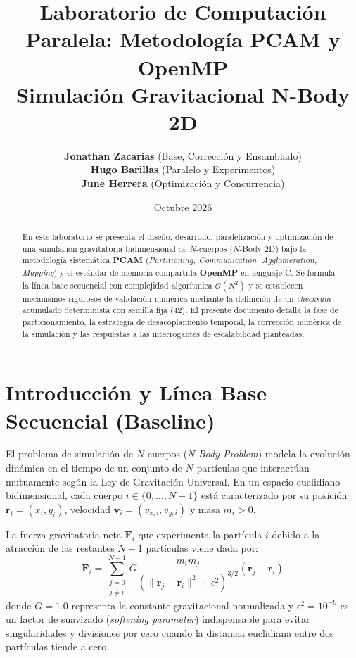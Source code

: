 \documentclass[11pt,a4paper]{article}
\title{
    \vspace{-1.5cm}
    \textbf{\Large Laboratorio de Computación Paralela: Metodología PCAM y OpenMP}\\[0.2cm]
    \textbf{\large Simulación Gravitacional N-Body 2D}
}
\author{
    \textbf{Jonathan Zacarias} (Base, Corrección y Ensamblado) \\
    \textbf{Hugo Barillas} (Paralelo y Experimentos) \\
    \textbf{June Herrera} (Optimización y Concurrencia)
}
\date{Octubre 2026}
\begin{document}
\maketitle

\begin{abstract}
En este laboratorio se presenta el diseño, desarrollo, paralelización y optimización de una simulación gravitatoria bidimensional de $N$-cuerpos ($N$-Body 2D) bajo la metodología sistemática \textbf{PCAM} (\textit{Partitioning, Communication, Agglomeration, Mapping}) y el estándar de memoria compartida \textbf{OpenMP} en lenguaje C. Se formula la línea base secuencial con complejidad algorítmica $\mathcal{O}(N^2)$ y se establecen mecanismos rigurosos de validación numérica mediante la definición de un \textit{checksum} acumulado determinista con semilla fija ($42$). El presente documento detalla la fase de particionamiento, la estrategia de desacoplamiento temporal, la corrección numérica de la simulación y las respuestas a las interrogantes de escalabilidad planteadas.
\end{abstract}

\vspace{0.3cm}

\section{Introducción y Línea Base Secuencial (Baseline)}

El problema de simulación de $N$-cuerpos (\textit{N-Body Problem}) modela la evolución dinámica en el tiempo de un conjunto de $N$ partículas que interactúan mutuamente según la Ley de Gravitación Universal. En un espacio euclidiano bidimensional, cada cuerpo $i \in \{0, \dots, N-1\}$ está caracterizado por su posición $\mathbf{r}_i = (x_i, y_i)$, velocidad $\mathbf{v}_i = (v_{x,i}, v_{y,i})$ y masa $m_i > 0$.

La fuerza gravitatoria neta $\mathbf{F}_i$ que experimenta la partícula $i$ debido a la atracción de las restantes $N-1$ partículas viene dada por:
\begin{equation}
    \mathbf{F}_i = \sum_{\substack{j=0 \\ j \neq i}}^{N-1} G \frac{m_i m_j}{\left( \|\mathbf{r}_j - \mathbf{r}_i\|^2 + \epsilon^2 \right)^{3/2}} (\mathbf{r}_j - \mathbf{r}_i)
    \label{eq:fuerza}
\end{equation}
donde $G = 1.0$ representa la constante gravitacional normalizada y $\epsilon^2 = 10^{-9}$ es un factor de suavizado (\textit{softening parameter}) indispensable para evitar singularidades y divisiones por cero cuando la distancia euclidiana entre dos partículas tiende a cero.
\end{document}
